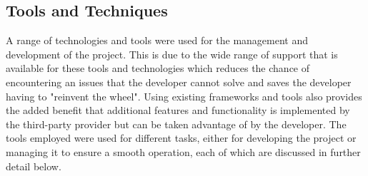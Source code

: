 \subsection{Tools and Techniques}
A range of technologies and tools were used for the management and development of the project. This is due to the wide range of support that is available for these tools and technologies which reduces the chance of encountering an issues that the developer cannot solve and saves the developer having to "reinvent the wheel". Using existing frameworks and tools also provides the added benefit that additional features and functionality is implemented by the third-party provider but can be taken advantage of by the developer. The tools employed were used for different tasks, either for developing the project or managing it to ensure a smooth operation, each of which are discussed in further detail below.

